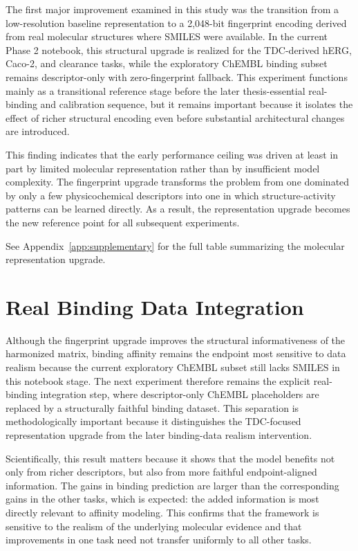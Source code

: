 \documentclass[a4paper,11pt,twoside]{report}
\begin{document}
The first major improvement examined in this study was the transition from a low-resolution baseline representation to a 2,048-bit fingerprint encoding derived from real molecular structures where SMILES were available. In the current Phase 2 notebook, this structural upgrade is realized for the TDC-derived hERG, Caco-2, and clearance tasks, while the exploratory ChEMBL binding subset remains descriptor-only with zero-fingerprint fallback. This experiment functions mainly as a transitional reference stage before the later thesis-essential real-binding and calibration sequence, but it remains important because it isolates the effect of richer structural encoding even before substantial architectural changes are introduced.

This finding indicates that the early performance ceiling was driven at least in part by limited molecular representation rather than by insufficient model complexity. The fingerprint upgrade transforms the problem from one dominated by only a few physicochemical descriptors into one in which structure-activity patterns can be learned directly. As a result, the representation upgrade becomes the new reference point for all subsequent experiments.


See Appendix~\ref{app:supplementary} for the full table summarizing the molecular representation upgrade.

\section{Real Binding Data Integration}

Although the fingerprint upgrade improves the structural informativeness of the harmonized matrix, binding affinity remains the endpoint most sensitive to data realism because the current exploratory ChEMBL subset still lacks SMILES in this notebook stage. The next experiment therefore remains the explicit real-binding integration step, where descriptor-only ChEMBL placeholders are replaced by a structurally faithful binding dataset. This separation is methodologically important because it distinguishes the TDC-focused representation upgrade from the later binding-data realism intervention.

Scientifically, this result matters because it shows that the model benefits not only from richer descriptors, but also from more faithful endpoint-aligned information. The gains in binding prediction are larger than the corresponding gains in the other tasks, which is expected: the added information is most directly relevant to affinity modeling. This confirms that the framework is sensitive to the realism of the underlying molecular evidence and that improvements in one task need not transfer uniformly to all other tasks.
\end{document}
